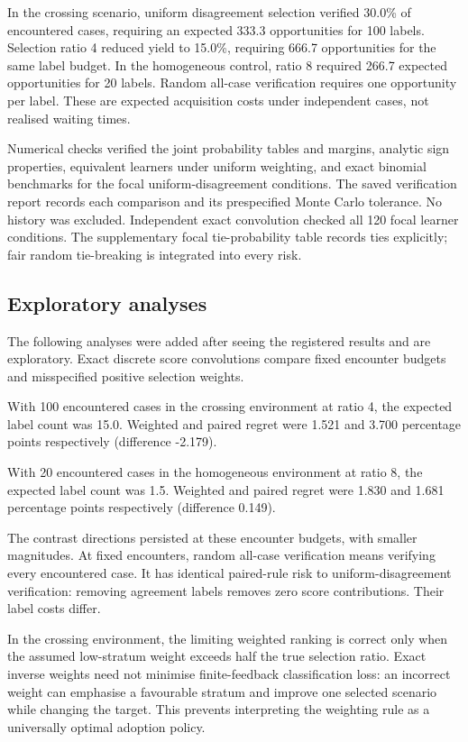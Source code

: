 \documentclass[
  british,
  11pt,
]{article}
\begin{document}
In the crossing scenario, uniform disagreement selection verified 30.0\%
of encountered cases, requiring an expected 333.3 opportunities for 100
labels. Selection ratio 4 reduced yield to 15.0\%, requiring 666.7
opportunities for the same label budget. In the homogeneous control,
ratio 8 required 266.7 expected opportunities for 20 labels. Random
all-case verification requires one opportunity per label. These are
expected acquisition costs under independent cases, not realised waiting
times.

Numerical checks verified the joint probability tables and margins,
analytic sign properties, equivalent learners under uniform weighting,
and exact binomial benchmarks for the focal uniform-disagreement
conditions. The saved verification report records each comparison and
its prespecified Monte Carlo tolerance. No history was excluded.
Independent exact convolution checked all 120 focal learner conditions.
The supplementary focal tie-probability table records ties explicitly;
fair random tie-breaking is integrated into every risk.

\subsection{Exploratory analyses}\label{exploratory-analyses}

The following analyses were added after seeing the registered results
and are exploratory. Exact discrete score convolutions compare fixed
encounter budgets and misspecified positive selection weights.

With 100 encountered cases in the crossing environment at ratio 4, the
expected label count was 15.0. Weighted and paired regret were 1.521 and
3.700 percentage points respectively (difference -2.179).

With 20 encountered cases in the homogeneous environment at ratio 8, the
expected label count was 1.5. Weighted and paired regret were 1.830 and
1.681 percentage points respectively (difference 0.149).

The contrast directions persisted at these encounter budgets, with
smaller magnitudes. At fixed encounters, random all-case verification
means verifying every encountered case. It has identical paired-rule
risk to uniform-disagreement verification: removing agreement labels
removes zero score contributions. Their label costs differ.

In the crossing environment, the limiting weighted ranking is correct
only when the assumed low-stratum weight exceeds half the true selection
ratio. Exact inverse weights need not minimise finite-feedback
classification loss: an incorrect weight can emphasise a favourable
stratum and improve one selected scenario while changing the target.
This prevents interpreting the weighting rule as a universally optimal
adoption policy.
\end{document}
